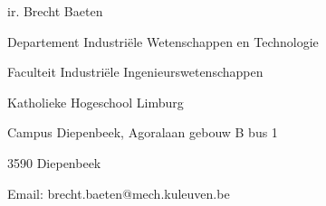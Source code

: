 \null
\vfill
ir. Brecht Baeten

Departement Industri\"ele Wetenschappen en Technologie

Faculteit Industri\"ele Ingenieurswetenschappen

Katholieke Hogeschool Limburg

Campus Diepenbeek, Agoralaan gebouw B bus 1

3590 Diepenbeek

Email: brecht.baeten@mech.kuleuven.be